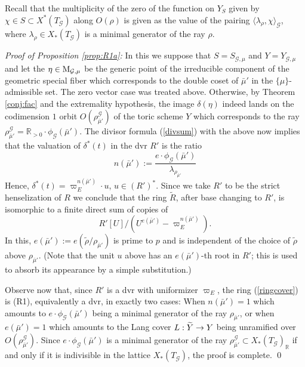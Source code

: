 \documentclass[reqno, 10pt]{amsart}
\makeatletter
\newcommand{\BR}{\ensuremath{\mathbb {R}}\xspace}
\newcommand{\CG}{\ensuremath{\mathcal {G}}\xspace}
\newcommand{\wt}{\widetilde}
\theoremstyle{definition}
\numberwithin{equation}{subsection}
\numberwithin{subsubsection}{subsection}
\renewcommand{\to}{%
   \ifbool{@display}{\longrightarrow}{\rightarrow}%
   }
\newcommand{\Mloc}{{\rm M}}
\newcommand{\ti}{\tilde}
\makeatother
\begin{document}
Recall that the multiplicity of the zero of the function on $Y_S$ given by $\chi\in S\subset X^*(T_\CG)$ along $O(\rho)$ is given as the value of the pairing 
$\langle \lambda_\rho, \chi\rangle_\CG$, where $\lambda_\rho\in X_*(T_\CG)$ is a minimal generator of the ray $\rho$. 

\textit{Proof of Proposition \ref{prop:R1a}:}
In this we suppose  that $S=S_{\CG,\mu}$ and $Y=Y_{\CG,\mu}$ and let the $\eta\in \Mloc_{\CG,\mu}$ be the generic point of the irreducible component of the geometric special fiber which corresponds to the double coset of $\bar\mu'$
in the $\{\mu\}$-admissible set.  The zero vector case was treated above.
Otherwise, by Theorem \ref{conj:fac} and the extremality hypothesis, the image $\delta(\eta)$ indeed  lands on the codimension $1$ orbit $O(\rho^\CG_{\bar\mu'})$ of the toric scheme $Y$ which corresponds to the ray $ \rho^\CG_{\bar\mu'}=\BR_{>0}\cdot \phi_\CG(\bar\mu')$. The divisor formula (\ref{divsum}) with the above
now implies that the valuation of $\delta^*(t)$ in the dvr $R'$ is the ratio 
\[
n(\bar\mu'):=\frac{  e\cdot \phi_\CG(\bar\mu')}{\lambda_{\rho_{\bar\mu'}}}
\]
Hence, $\delta^*(t)=\varpi_E^{n(\bar\mu')}\cdot u$, $u\in (R')^*$. Since we take $R'$ to be the strict henselization of $R$ we conclude that the ring $\ti R$, after base changing to $R'$, is isomorphic to a finite direct sum of copies of 
\begin{equation}\label{ringcover}
R'[U]/(U^{e(\bar\mu')}-\varpi^{n(\bar\mu')}_E).
\end{equation}
In this, $e(\bar\mu'):=e(\ti\rho/\rho_{\bar\mu'})$  is prime to $p$ and is independent of the choice of $\wt\rho$ above $\rho_{\bar\mu'}$. (Note that the unit $u$ above has an 
$e(\bar\mu')$-th root  in $R'$; this is used to absorb
its appearance by a simple substitution.) 

Observe now that, since $R'$ is a dvr with uniformizer $\varpi_E$, the ring (\ref{ringcover}) is (R1), equivalently a dvr, in exactly two cases: When 
$n(\bar\mu')=1$ which amounts to $e\cdot \phi_\CG(\bar\mu')$ being a minimal generator of the ray $\rho_{\bar\mu'}$, or when $e(\bar\mu')=1$ which amounts to the Lang cover 
$L: \wt Y\to Y$ being unramified over $O(\rho^\CG_{\bar\mu'})$. Since  $e\cdot \phi_\CG(\bar\mu')$ is a minimal generator of the ray $\rho^\CG_{\bar\mu'}\subset X_*(T_\CG)_\BR$ if and only if it is indivisible in the lattice $X_*(T_\CG)$, the proof is complete. \qed
\smallskip
\end{document}
